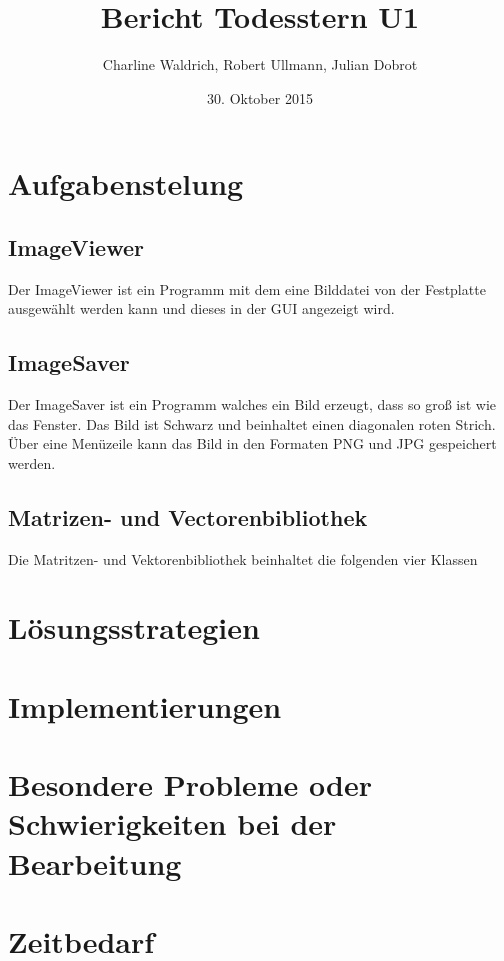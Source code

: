 \documentclass[a4paper,10pt]{scrreprt}
\title{Bericht Todesstern U1}
\author{Charline Waldrich, Robert Ullmann, Julian Dobrot}
\date{30. Oktober 2015}
\begin{document}
\maketitle
\tableofcontents

\section{Aufgabenstelung}
\subsection{ImageViewer}
Der ImageViewer ist ein Programm mit dem eine Bilddatei von der Festplatte ausgewählt werden kann und dieses in der GUI angezeigt wird. 
\subsection{ImageSaver}
Der ImageSaver ist ein Programm walches ein Bild erzeugt, dass so groß ist wie das Fenster.
Das Bild ist Schwarz und beinhaltet einen diagonalen roten Strich. Über eine Menüzeile kann das Bild in den Formaten PNG und JPG gespeichert werden.
\subsection{Matrizen- und Vectorenbibliothek}
Die Matritzen- und Vektorenbibliothek beinhaltet die folgenden vier Klassen 

\section{Lösungsstrategien}
\section{Implementierungen}
\section{Besondere Probleme oder Schwierigkeiten bei der Bearbeitung}
\section{Zeitbedarf}
\end{document}
